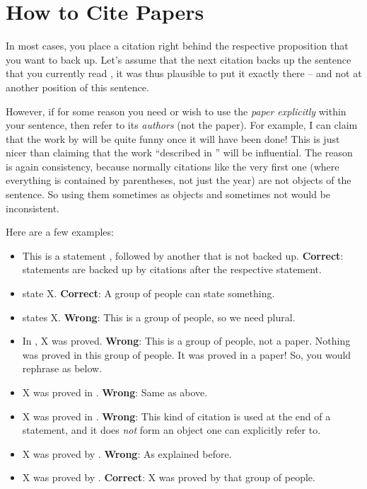     


\section{How to Cite Papers}

In most cases, you place a citation right behind the respective proposition that you want to back up. Let's assume that the next citation backs up the sentence that you currently read \citep{Smith2021Wubalubadubdub}, it was thus plausible to put it exactly there -- and not at another position of this sentence.

However, if for some reason you need or wish to use the \emph{paper explicitly} within your sentence, then refer to its \emph{authors} (not the paper). For example, I can claim that the work by \cite{Smith2021Wubalubadubdub} will be quite funny once it will have been done! This is just nicer than claiming that the work ``described in \citep{Smith2021Wubalubadubdub}'' will be influential. The reason is again consistency, because normally citations like the very first one (where everything is contained by parentheses, not just the year) are not objects of the sentence. So using them sometimes as objects and sometimes not would be inconsistent.
 
Here are a few examples:
\begin{itemize}
  \item This is a statement \citep{Smith2021Wubalubadubdub}, followed by another that is not backed up. \textbf{Correct}: statements are backed up by citations after the respective statement.
  \item \cite{Smith2021Wubalubadubdub} state X. \textbf{Correct}: A group of people can state something.
  \item \cite{Smith2021Wubalubadubdub} states X. \textbf{Wrong}: This is a group of people, so we need plural.
  \item In \cite{Smith2021Wubalubadubdub}, X was proved. \textbf{Wrong}: This is a group of people, not a paper. Nothing was proved in this group of people. It was proved in a paper! So, you would rephrase as below.
  \item X was proved in \cite{Smith2021Wubalubadubdub}. \textbf{Wrong}: Same as above.
  \item X was proved in \citep{Smith2021Wubalubadubdub}. \textbf{Wrong}: This kind of citation is used at the end of a statement, and it does \emph{not} form an object one can explicitly refer to.
  \item X was proved by \citep{Smith2021Wubalubadubdub}. \textbf{Wrong}: As explained before.
  \item X was proved by \cite{Smith2021Wubalubadubdub}. \textbf{Correct}: X was proved by that group of people.
\end{itemize}

